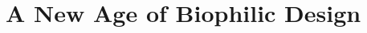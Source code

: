 \documentclass{article}
\begin{document}

\clearpage
\section{A New Age of Biophilic Design}
\end{document}

